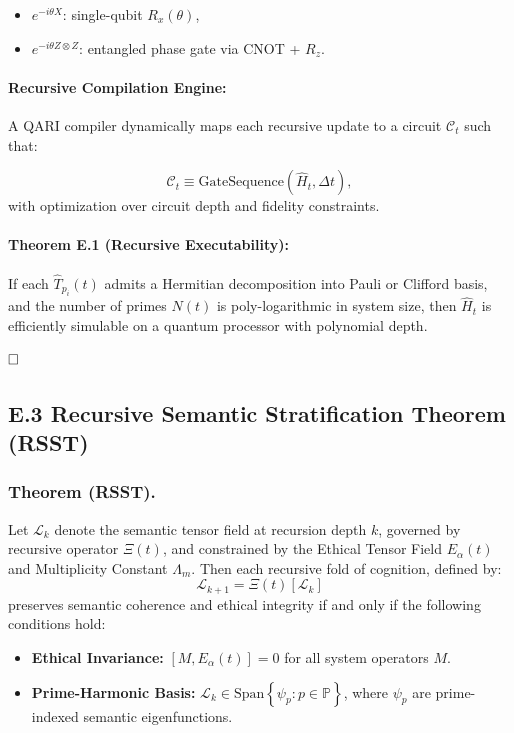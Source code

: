 \documentclass[12pt]{article}
\begin{document}
\begin{itemize}
\begin{itemize}
    \item \(e^{-i \theta X}\): single-qubit \(R_x(\theta)\),
    \item \(e^{-i \theta Z \otimes Z}\): entangled phase gate via CNOT + \(R_z\).
\end{itemize}

\paragraph{Recursive Compilation Engine:}
A QARI compiler dynamically maps each recursive update to a circuit \(\mathcal{C}_t\) such that:

\[
\mathcal{C}_t \equiv \text{GateSequence}(\hat{H}_t, \Delta t),
\]
with optimization over circuit depth and fidelity constraints.

\paragraph{Theorem E.1 (Recursive Executability):}
If each \(\hat{T}_{p_i}(t)\) admits a Hermitian decomposition into Pauli or Clifford basis, and the number of primes \(N(t)\) is poly-logarithmic in system size, then \(\hat{H}_t\) is efficiently simulable on a quantum processor with polynomial depth.

\(\hfill \square\)
\subsection*{E.3 Recursive Semantic Stratification Theorem (RSST)}

\subsubsection{Theorem (RSST).} Let \(\mathcal{L}_k\) denote the semantic tensor field at recursion depth \(k\), governed by recursive operator \(\Xi(t)\), and constrained by the Ethical Tensor Field \(E_\alpha(t)\) and Multiplicity Constant \(\Lambda_m\). Then each recursive fold of cognition, defined by:
\[
\mathcal{L}_{k+1} = \Xi(t)[\mathcal{L}_k]
\]
preserves semantic coherence and ethical integrity if and only if the following conditions hold:

\begin{itemize}
  \item \textbf{Ethical Invariance:} \([M, E_\alpha(t)] = 0\) for all system operators \(M\).
  \item \textbf{Prime-Harmonic Basis:} \(\mathcal{L}_k \in \text{Span}\left\{ \psi_p : p \in \mathbb{P} \right\}\), where \(\psi_p\) are prime-indexed semantic eigenfunctions.
\end{itemize}


\end{itemize}
\end{document}
